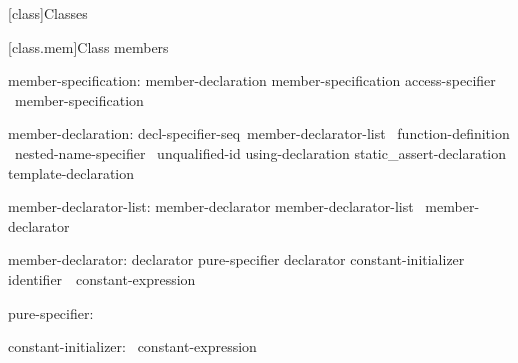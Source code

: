 \documentclass[american]{book}
\begin{document}
\setcounter{chapter}{8}
[class]{Classes}
\begin{paras}
\setcounter{section}{1}
[class.mem]{Class members}

%
%
%
%

\begin{bnf}
%
member-specification:\br
        member-declaration member-specification\opt\br
        access-specifier \terminal{:}\ member-specification\opt
\end{bnf}

\begin{bnf}
%
%
member-declaration:\br
         decl-specifier-seq\opt\ member-declarator-list\opt\ \terminal{;}\br
         function-definition \terminal{;\opt}\br
        \terminal{::\opt}\ nested-name-specifier \ unqualified-id \terminal{;}\br
        using-declaration\br
        static_assert-declaration\br
        template-declaration\br
\end{bnf}

\begin{bnf}
%
\br
\end{bnf}

\begin{bnf}
member-declarator-list:\br
        member-declarator\br
        member-declarator-list \terminal{,}\ member-declarator
\end{bnf}

\begin{bnf}
%
member-declarator:\br
        declarator pure-specifier\opt\br
        declarator constant-initializer\opt\br
        identifier\opt\ \terminal{:}\ constant-expression
\end{bnf}

\begin{bnf}
%
%
pure-specifier:\br
\end{bnf}

\begin{bnf}
%
%
constant-initializer:\br
        \terminal{=}\ constant-expression
\end{bnf}


\end{paras}
\end{document}
